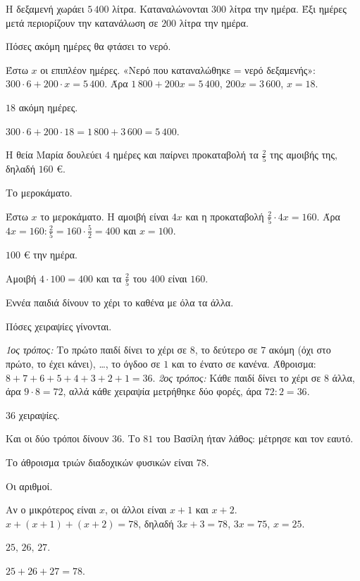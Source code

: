 \tixero Η δεξαμενή χωράει $5\,400$ λίτρα. Καταναλώνονται $300$ λίτρα την ημέρα. Έξι ημέρες μετά περιορίζουν την κατανάλωση σε $200$ λίτρα την ημέρα.\par
\tithelo Πόσες ακόμη ημέρες θα φτάσει το νερό.\par
\possindeo Έστω $x$ οι επιπλέον ημέρες. «Νερό που καταναλώθηκε = νερό δεξαμενής»: $300\cdot6+200\cdot x=5\,400$. Άρα $1\,800+200x=5\,400$, $200x=3\,600$, $x=18$.\par
\apantisi $18$ ακόμη ημέρες.\par
\elegxos $300\cdot6+200\cdot18=1\,800+3\,600=5\,400$.

\tixero Η θεία Μαρία δουλεύει $4$ ημέρες και παίρνει προκαταβολή τα $\frac{2}{5}$ της αμοιβής της, δηλαδή $160$ €.\par
\tithelo Το μεροκάματο.\par
\possindeo Έστω $x$ το μεροκάματο. Η αμοιβή είναι $4x$ και η προκαταβολή $\frac{2}{5}\cdot4x=160$. Άρα $4x=160:\frac{2}{5}=160\cdot\frac{5}{2}=400$ και $x=100$.\par
\apantisi $100$ € την ημέρα.\par
\elegxos Αμοιβή $4\cdot100=400$ και τα $\frac{2}{5}$ του $400$ είναι $160$.

\tixero Εννέα παιδιά δίνουν το χέρι το καθένα με όλα τα άλλα.\par
\tithelo Πόσες χειραψίες γίνονται.\par
\possindeo \emph{1ος τρόπος:} Το πρώτο παιδί δίνει το χέρι σε $8$, το δεύτερο σε $7$ ακόμη (όχι στο πρώτο, το έχει κάνει), \dots, το όγδοο σε $1$ και το ένατο σε κανένα. Άθροισμα: $8+7+6+5+4+3+2+1=36$. \emph{2ος τρόπος:} Κάθε παιδί δίνει το χέρι σε $8$ άλλα, άρα $9\cdot8=72$, αλλά κάθε χειραψία μετρήθηκε δύο φορές, άρα $72:2=36$.\par
\apantisi $36$ χειραψίες.\par
\elegxos Και οι δύο τρόποι δίνουν $36$. Το $81$ του Βασίλη ήταν λάθος: μέτρησε και τον εαυτό.

\tixero Το άθροισμα τριών διαδοχικών φυσικών είναι $78$.\par
\tithelo Οι αριθμοί.\par
\possindeo Αν ο μικρότερος είναι $x$, οι άλλοι είναι $x+1$ και $x+2$. $x+(x+1)+(x+2)=78$, δηλαδή $3x+3=78$, $3x=75$, $x=25$.\par
\apantisi $25,\,26,\,27$.\par
\elegxos $25+26+27=78$.

